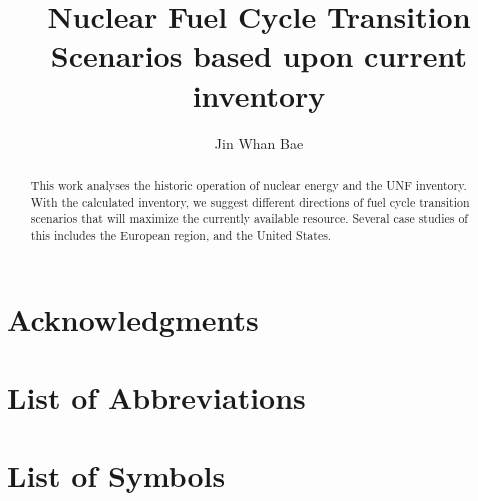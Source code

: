 \documentclass{article}
\begin{document}
\title{Nuclear Fuel Cycle Transition Scenarios based upon current inventory}
\author{Jin Whan Bae}


\begin{abstract}
This work analyses the historic operation of nuclear energy and the \gls{UNF} inventory.
With the calculated inventory, we suggest different
directions of fuel cycle transition scenarios that will maximize the currently
available resource. Several case studies of this includes the European region,
and the United States.
\end{abstract} 

\chapter*{Acknowledgments}



\tableofcontents
\listoftables
\listoffigures

\chapter{List of Abbreviations}
\printglossaries
\chapter{List of Symbols}


\pagebreak
\end{document}
